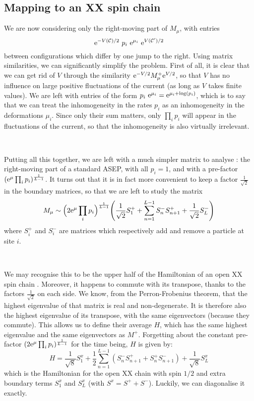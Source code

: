\documentclass[aps,pre,onecolumn,showpacs,showkeys,a4paper]{revtex4-1}
\begin{document}
\subsection{Mapping to an XX spin chain}
\label{IIIa}

We are now considering only the right-moving part of $M_\mu$, with entries
\begin{equation}
{\rm e}^{-V({\cal C})/2}~p_i~{\rm e}^{\mu_i}~{\rm e}^{V({\cal C}')/2}
\end{equation}
between configurations which differ by one jump to the right. Using matrix similarities, we can significantly simplify the problem. First of all, it is clear that we can get rid of $V$ through the similarity ${\rm e}^{-V/2}M^+_\mu{\rm e}^{V/2}$, so that $V$ has no influence on large positive fluctuations of the current (as long as $V$ takes finite values). We are left with entries of the form $p_i~{\rm e}^{\mu_i}={\rm e}^{\mu_i+\log(p_i)}$, which is to say that we can treat the inhomogeneity in the rates $p_i$ as an inhomogeneity in the deformations $\mu_i$. Since only their sum matters, only $\prod_i p_i$ will appear in the fluctuations of the current, so that the inhomogeneity is also virtually irrelevant.

~

Putting all this together, we are left with a much simpler matrix to analyse : the right-moving part of a standard ASEP, with all $p_i=1$, and with a pre-factor $({\rm e}^{\mu}\prod_i p_i )^{\frac{1}{L-1}}$. It turns out that it is in fact more convenient to keep a factor $\frac{1}{\sqrt{2}}$ in the boundary matrices, so that we are left to study the matrix
\begin{equation}
M_\mu\sim\Bigl(2{\rm e}^{\mu}\prod_i p_i \Bigr)^{\frac{1}{L-1}}\Biggl(\frac{1}{\sqrt{2}} S_1^+ +\sum\limits_{n=1}^{L-1}S_n^- S_{n+1}^+ +\frac{1}{\sqrt{2}}S_L^-\Biggr)
\end{equation}
where $S_i^+$ and $S_i^-$ are matrices which respectively add and remove a particle at site $i$.

~

We may recognise this to be the upper half of the Hamiltonian of an open XX spin chain \cite{Bilstein1999}. Moreover, it happens to commute with its transpose, thanks to the factors $\frac{1}{\sqrt{2}}$ on each side. We know, from the Perron-Frobenius theorem, that the highest eigenvalue of that matrix is real and non-degenerate. It is therefore also the highest eigenvalue of its transpose, with the same eigenvectors (because they commute). This allows us to define their average $H$, which has the same highest eigenvalue and the same eigenvectors as $M^+$. Forgetting about the constant pre-factor $(2{\rm e}^{\mu}\prod_i p_i )^{\frac{1}{L-1}}$ for the time being, $H$ is given by:
\begin{equation}\boxed{
H=\frac{1}{\sqrt{8}} S_1^x +\frac{1}{2}\sum\limits_{n=1}^{L-1}(S_n^- S_{n+1}^++S_n^+ S_{n+1}^-) +\frac{1}{\sqrt{8}}S_L^x
}\end{equation}
which is the Hamiltonian for the open XX chain with spin $1/2$ and extra boundary terms $S_1^x$ and $S_L^x$ (with $S^x=S^++S^-$). Luckily, we can diagonalise it exactly.
\end{document}
